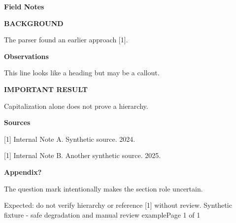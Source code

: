 \documentclass[11pt,a4paper]{article}
\begin{document}
{\fontsize{21}{25}\selectfont\bfseries Field Notes}\par\vspace{8mm}
{\color{orange!70!black}\fontsize{14}{18}\selectfont\bfseries BACKGROUND}\par\vspace{3mm}
The parser found an earlier approach [1].\par\vspace{7mm}
{\color{orange!70!black}\fontsize{14}{18}\selectfont\bfseries Observations}\par\vspace{3mm}
This line looks like a heading but may be a callout.\par\vspace{7mm}
{\color{orange!70!black}\fontsize{14}{18}\selectfont\bfseries IMPORTANT RESULT}\par\vspace{3mm}
Capitalization alone does not prove a hierarchy.\par\vspace{7mm}
{\color{orange!70!black}\fontsize{14}{18}\selectfont\bfseries Sources}\par\vspace{3mm}
[1] Internal Note A. Synthetic source. 2024.\par\vspace{3mm}
[1] Internal Note B. Another synthetic source. 2025.\par\vspace{7mm}
{\color{orange!70!black}\fontsize{14}{18}\selectfont\bfseries Appendix?}\par\vspace{3mm}
The question mark intentionally makes the section role uncertain.\par\vspace{8mm}
\color{orange!70!black}\small Expected: do not verify hierarchy or reference [1] without review.
\vfill\scriptsize Synthetic fixture - safe degradation and manual review example\hfill Page 1 of 1
\end{document}
